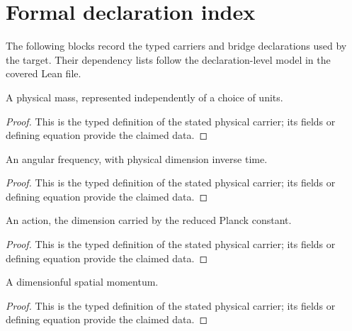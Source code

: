 \section*{Formal declaration index}
The following blocks record the typed carriers and bridge declarations used by the target.  Their dependency lists follow the declaration-level model in the covered Lean file.

\begin{definition}
  \label{def:physics:IPhO_2026_1_C_2:aux001}
  A physical mass, represented independently of a choice of units.
\end{definition}
\begin{proof}
  This is the typed definition of the stated physical carrier; its fields or defining equation provide the claimed data.
\end{proof}

\begin{definition}
  \label{def:physics:IPhO_2026_1_C_2:aux002}
  An angular frequency, with physical dimension inverse time.
\end{definition}
\begin{proof}
  This is the typed definition of the stated physical carrier; its fields or defining equation provide the claimed data.
\end{proof}

\begin{definition}
  \label{def:physics:IPhO_2026_1_C_2:aux003}
  An action, the dimension carried by the reduced Planck constant.
\end{definition}
\begin{proof}
  This is the typed definition of the stated physical carrier; its fields or defining equation provide the claimed data.
\end{proof}

\begin{definition}
  \label{def:physics:IPhO_2026_1_C_2:aux004}
  A dimensionful spatial momentum.
\end{definition}
\begin{proof}
  This is the typed definition of the stated physical carrier; its fields or defining equation provide the claimed data.
\end{proof}

